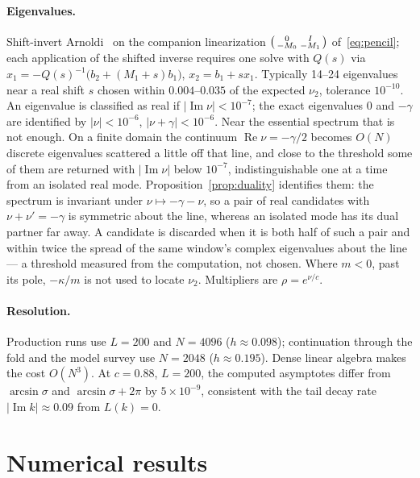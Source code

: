 \documentclass[11pt]{article}
\theoremstyle{plain}
\theoremstyle{definition}
\theoremstyle{remark}
\begin{document}
\paragraph{Eigenvalues.} Shift-invert Arnoldi~\cite{LSY98} on the companion linearization
$\begin{psmallmatrix}0&I\\-M_0&-M_1\end{psmallmatrix}$ of~\eqref{eq:pencil}; each application
of the shifted inverse requires one solve with $Q(s)$ via
$x_1=-Q(s)^{-1}\bigl(b_2+(M_1+s)b_1\bigr)$, $x_2=b_1+sx_1$. Typically 14--24 eigenvalues
near a real shift $s$ chosen within $0.004$--$0.035$ of the expected $\nu_2$, tolerance
$10^{-10}$. An eigenvalue is classified as real if $|\operatorname{Im}\nu|<10^{-7}$; the exact
eigenvalues $0$ and $-\gamma$ are identified by $|\nu|<10^{-6}$, $|\nu+\gamma|<10^{-6}$.
Near the essential spectrum that is not enough. On a finite domain the continuum
$\operatorname{Re}\nu=-\gamma/2$ becomes $O(N)$ discrete eigenvalues scattered a little off
that line, and close to the threshold some of them are returned with
$|\operatorname{Im}\nu|$ below $10^{-7}$, indistinguishable one at a time from an isolated
real mode. Proposition~\ref{prop:duality} identifies them: the spectrum is invariant under
$\nu\mapsto-\gamma-\nu$, so a pair of real candidates with $\nu+\nu'=-\gamma$ is symmetric
about the line, whereas an isolated mode has its dual partner far away. A candidate is
discarded when it is both half of such a pair and within twice the spread of the same
window's complex eigenvalues about the line --- a threshold measured from the computation,
not chosen. Where $m<0$, past its pole, $-\kappa/m$ is not used to locate $\nu_2$.
Multipliers are $\rho=e^{\nu/c}$.

\paragraph{Resolution.} Production runs use $L=200$ and $N=4096$ ($h\approx0.098$);
continuation through the fold and the model survey use $N=2048$ ($h\approx0.195$). Dense
linear algebra makes the cost $O(N^3)$. At $c=0.88$, $L=200$, the computed asymptotes differ
from $\arcsin\sigma$ and $\arcsin\sigma+2\pi$ by $5\times10^{-9}$, consistent with the tail
decay rate $|\operatorname{Im}k|\approx0.09$ from $L(k)=0$.

\section{Numerical results}\label{sec:results}
\end{document}
